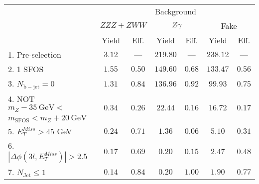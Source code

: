\begin{tabular}{l||c|c||c|c||c|c}
\hline
 &       \multicolumn{6}{c}{Background}\\
 &  \multicolumn{2}{c||}{$ZZZ+ZWW$} & \multicolumn{2}{c||}{$Z\gamma$} & \multicolumn{2}{c}{Fake} \\ 
 & Yield & Eff. & Yield & Eff. & Yield & Eff. \\
\hline\hline
1. Pre-selection &  $3.12$ & --- &  $219.80$ & --- &  $238.12$ & ---  \\
\hline
2. 1 SFOS &  $1.55$ &  $0.50$ &  $149.60$ &  $0.68$ &  $133.47$ &  $0.56$ \\ 
\hline
3. $N_{\mathrm{b-jet}} = 0$ &  $1.31$ &  $0.84$ &  $136.96$ &  $0.92$ &  $99.93$ &  $0.75$ \\ 
\hline
4. NOT $m_Z - 35~\mathrm{GeV} <$  &  \multirow{2}{*}{$0.34$} &  \multirow{2}{*}{$0.26$} &  \multirow{2}{*}{$22.44$} &  \multirow{2}{*}{$0.16$} &  \multirow{2}{*}{$16.72$} &  \multirow{2}{*}{$0.17$} \\ 
$ m_{\mathrm{SFOS}} < m_Z + 20~\mathrm{GeV}$ & & & & & &  \\
\hline
5. $E_{T}^{Miss} > 45$ GeV &  $0.24$ &  $0.71$ &  $1.36$ &  $0.06$ &  $5.10$ &  $0.31$ \\ 
\hline
6. $|\Delta\phi(3l,E_{T}^{Miss})| > 2.5$ &  $0.17$ &  $0.69$ &  $0.20$ &  $0.15$ &  $2.47$ &  $0.48$ \\ 
\hline
7. $N_{\mathrm{Jet}} \leq 1$ &  $0.14$ &  $0.84$ &  $0.20$ &  $1.00$ &  $1.90$ &  $0.77$\\ 
\hline
\end{tabular}
